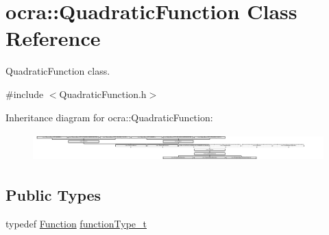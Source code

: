 \hypertarget{classocra_1_1QuadraticFunction}{}\section{ocra\+:\+:Quadratic\+Function Class Reference}
\label{classocra_1_1QuadraticFunction}


Quadratic\+Function class.  




{\ttfamily \#include $<$Quadratic\+Function.\+h$>$}

Inheritance diagram for ocra\+:\+:Quadratic\+Function\+:\begin{figure}[H]
\begin{center}
\leavevmode
\includegraphics[height=1.082126cm]{d9/d7e/classocra_1_1QuadraticFunction}
\end{center}
\end{figure}
\subsection*{Public Types}
\begin{DoxyCompactItemize}
\item 
typedef \hyperlink{classocra_1_1Function}{Function} \hyperlink{classocra_1_1QuadraticFunction_a224eecd300c5a16599ebd6e4eff5d9d7}{function\+Type\+\_\+t}
\end{DoxyCompactItemize}
